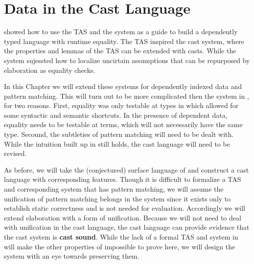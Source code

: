 \chapter{Data in the Cast Language}
\label{chapter:CastData}
\thispagestyle{myheadings}
 
 showed how to use the \ac{TAS} and the \bidir{} system as a guide to build a dependently typed language with runtime equality.
The \ac{TAS} inspired the cast system, where the properties and lemmas of the \ac{TAS} can be extended with casts.
While the \bidir{} system sujessted how to localize uncirtain assumptions that can be repurposed by elaboration as equality checks.

In this Chapter we will extend these systems for dependently indexed data and pattern matching.
This will turn out to be more complicated then the system in , for two reasons.
First, equality was only testable at types in  which allowed for some syntactic and semantic shortcuts.
In the presence of dependent data, equality needs to be testable at terms, which will not necessarily have the same type.
Secound, the subtleties of pattern matching will need to be dealt with.
While the intuition built up in  still holds, the cast language will need to be revised.
 
As before, we will take the (conjectured) surface language of  and construct a cast language with corresponding features.
Though it is difficult to formalize a \ac{TAS} and corresponding \bidir{} system that has pattern matching, we will assume the unification of pattern matching belongs in the \bidir{} system since it exists only to establish static correctness and is not needed for evaluation.
Accordingly we will extend elaboration with a form of unification.
Because we will not need to deal with unification in the cast language, the cast language can provide evidence that the cast system is \textbf{cast sound}. 
While the lack of a formal \ac{TAS} and \bidir{} system in  will make the other properties of  impossible to prove here, we will design the system with an eye towards preserving them.
 
 
